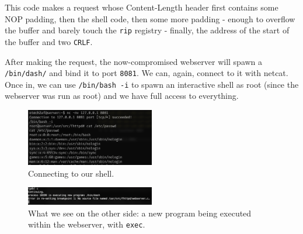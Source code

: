 \documentclass[a4paper,11pt,hidelinks]{article}
\begin{document}
This code makes a request whose Content-Length header first contains some NOP padding, then the shell code, then some more padding - enough to overflow the buffer and barely touch the \verb=rip= registry - finally, the address of the start of the buffer and two \verb=CRLF=.

After making the request, the now-compromised webserver will spawn a \verb=/bin/dash/= and bind it to port \verb=8081=. We can, again, connect to it with netcat. Once in, we can use \verb=/bin/bash -i= to spawn an interactive shell as root (since the webserver was run as root) and we have full access to everything.

\begin{figure}[h!]
  \centering
  \includegraphics[width=0.5\textwidth]{drawable/connecting-to-bindshell.png}
  \caption{Connecting to our shell.}
\end{figure}

\begin{figure}[h!]
  \centering
  \includegraphics[width=0.5\textwidth]{drawable/executing-new-program.png}
  \caption{What we see on the other side: a new program being executed within the webserver, with \texttt{exec}.}
\end{figure}

\endgroup
\end{document}
